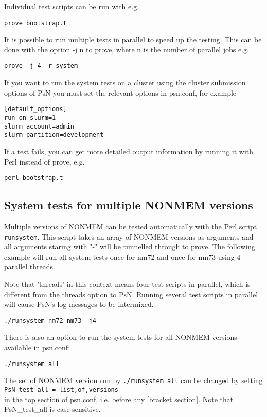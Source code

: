 Individual test scripts can be run with e.g. 
\begin{verbatim}
prove bootstrap.t
\end{verbatim}

It is possible to run multiple tests in parallel to speed up the testing. This can be done with the option -j n to prove, where n is the number of parallel jobs e.g.
\begin{verbatim}
prove -j 4 -r system
\end{verbatim}

If you want to run the system tests on a cluster using the cluster submission options of PsN 
you must set the relevant options in psn.conf, for example
\begin{verbatim}
[default_options]
run_on_slurm=1
slurm_account=admin
slurm_partition=development
\end{verbatim}

If a test fails, you can get more detailed output information by running it with Perl instead of prove, e.g.
\begin{verbatim}
perl bootstrap.t
\end{verbatim}

\subsection{System tests for multiple NONMEM versions}
Multiple versions of NONMEM can be tested automatically with the Perl script \verb|runsystem|. This script takes
an array of NONMEM versions as arguments and all arguments staring with "-" will be tunnelled through to prove.
The following example will run all system tests once for nm72 and once for nm73 using 4 parallel threads.

Note that 'threads' in this context means four test scripts in parallel, which is different from the
threads option to PsN. Running several test scripts in parallel will cause PsN's log messages to be intermixed.
\begin{verbatim}
./runsystem nm72 nm73 -j4
\end{verbatim}
There is also an option to run the system tests for all NONMEM versions available in psn.conf:
\begin{verbatim}
./runsystem all
\end{verbatim}
The set of NONMEM version run by \verb|./runsystem all| can be changed by setting\\
\verb|PsN_test_all = list,of,versions| \\
in the top section of psn.conf, i.e. before any [bracket section].
Note that PsN\_test\_all is case sensitive.

